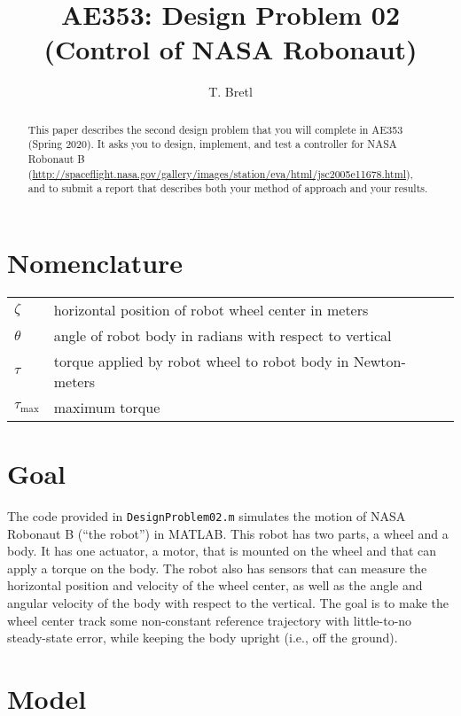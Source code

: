 \documentclass[conf]{new-aiaa}
\title{AE353: Design Problem 02\\ (Control of NASA Robonaut)}
\author{T. Bretl}
\begin{document}
\maketitle

\begin{abstract}
This paper describes the second design problem that you will complete in AE353 (Spring 2020). It asks you to design, implement, and test a controller for NASA Robonaut B (\url{http://spaceflight.nasa.gov/gallery/images/station/eva/html/jsc2005e11678.html}), and to submit a report that describes both your method of approach and your results.
\end{abstract}


\section{Nomenclature}

{\renewcommand\arraystretch{1.0}
\noindent\begin{longtable*}{@{}l @{\quad=\quad} l@{}}
$\zeta$ & horizontal position of robot wheel center in meters \\
$\theta$ & angle of robot body in radians with respect to vertical \\
$\tau$ & torque applied by robot wheel to robot body in Newton-meters \\
$\tau_{\text{max}}$ & maximum torque
\end{longtable*}}


\section{Goal}

The code provided in \lstinline!DesignProblem02.m! simulates the motion of NASA Robonaut B (``the robot'') in MATLAB. This robot has two parts, a wheel and a body. It has one actuator, a motor, that is mounted on the wheel and that can apply a torque on the body. The robot also has sensors that can measure the horizontal position and velocity of the wheel center, as well as the angle and angular velocity of the body with respect to the vertical. The goal is to make the wheel center track some non-constant reference trajectory with little-to-no steady-state error, while keeping the body upright (i.e., off the ground).


\section{Model}
\end{document}
